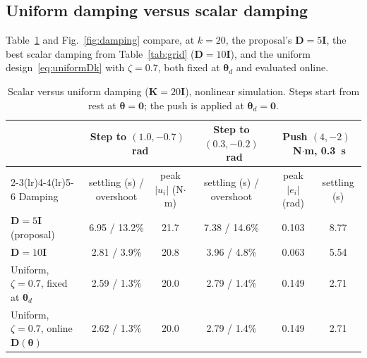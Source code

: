 \documentclass[letterpaper, 10pt, conference]{ieeeconf}
\begin{document}
\begin{table}[htbp]
\centering
\caption{Scalar gains, step of $(0.3,-0.2)$~rad: 2\% settling time
(s) / overshoot (\%) / smallest modal $\zeta$.}
\label{tab:grid}
\end{table}

\subsection{Uniform damping versus scalar damping}

Table~\ref{tab:damping} and Fig.~\ref{fig:damping} compare, at
$k=20$, the proposal's $\mathbf{D}=5\mathbf{I}$, the best scalar
damping from Table~\ref{tab:grid} ($\mathbf{D}=10\mathbf{I}$), and the
uniform design~\eqref{eq:uniformDk} with $\zeta=0.7$, both fixed at
$\boldsymbol{\theta}_d$ and evaluated online.

\begin{table}[!t]
\centering
\caption{Scalar versus uniform damping ($\mathbf{K}=20\mathbf{I}$),
nonlinear simulation. Steps start from rest at
$\boldsymbol{\theta}=\mathbf{0}$; the push is applied at
$\boldsymbol{\theta}_d=\mathbf{0}$.}
\label{tab:damping}
\begin{tabular}{@{}lccccc@{}}
\toprule
 & \multicolumn{2}{c}{Step to $(1.0,-0.7)$~rad} & Step to $(0.3,-0.2)$~rad & \multicolumn{2}{c}{Push $(4,-2)$~N$\cdot$m, 0.3~s} \\
\cmidrule(lr){2-3}\cmidrule(lr){4-4}\cmidrule(lr){5-6}
Damping & settling (s) / overshoot & peak $|u_i|$ (N$\cdot$m) & settling (s) / overshoot & peak $|e_i|$ (rad) & settling (s) \\
\midrule
$\mathbf{D}=5\mathbf{I}$ (proposal) & 6.95 / 13.2\% & 21.7 & 7.38 / 14.6\% & 0.103 & 8.77 \\
$\mathbf{D}=10\mathbf{I}$ & 2.81 / 3.9\% & 20.8 & 3.96 / 4.8\% & 0.063 & 5.54 \\
Uniform, $\zeta=0.7$, fixed at $\boldsymbol{\theta}_d$ & 2.59 / 1.3\% & 20.0 & 2.79 / 1.4\% & 0.149 & 2.71 \\
Uniform, $\zeta=0.7$, online $\mathbf{D}(\boldsymbol{\theta})$ & 2.62 / 1.3\% & 20.0 & 2.79 / 1.4\% & 0.149 & 2.71 \\
\bottomrule
\end{tabular}
\end{table}
\end{document}
